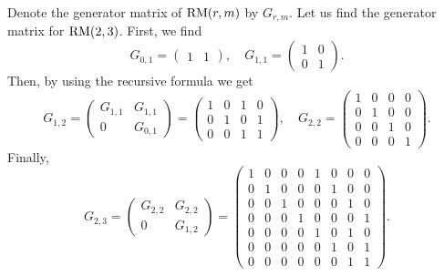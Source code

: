 \documentclass[../main.tex]{subfiles}
\begin{document}
\begin{example}
Denote the generator matrix of $\operatorname{RM}(r, m)$ by $G_{r, m}$. Let us find the generator matrix for $\operatorname{RM}(2, 3)$. First, we find
\begin{equation*}
    G_{0, 1} =
    \begin{pmatrix}
        1 & 1
    \end{pmatrix}, \quad
    G_{1, 1} =
    \begin{pmatrix}
        1 & 0 \\
        0 & 1
    \end{pmatrix}.
\end{equation*}
Then, by using the recursive formula we get
\begin{equation*}
    G_{1, 2} =
    \begin{pmatrix}
        G_{1, 1} & G_{1, 1} \\
        0 & G_{0, 1}
    \end{pmatrix} =
    \begin{pmatrix}
        1 & 0 & 1 & 0 \\
        0 & 1 & 0 & 1 \\
        0 & 0 & 1 & 1
    \end{pmatrix}, \quad
    G_{2, 2} =
    \begin{pmatrix}
        1 & 0 & 0 & 0 \\
        0 & 1 & 0 & 0 \\
        0 & 0 & 1 & 0 \\
        0 & 0 & 0 & 1
    \end{pmatrix}.
\end{equation*}
Finally,
\begin{equation*}
    G_{2, 3} =
    \begin{pmatrix}
        G_{2, 2} & G_{2, 2} \\
        0 & G_{1, 2}
    \end{pmatrix} =
    \begin{pmatrix}
        1 & 0 & 0 & 0 & 1 & 0 & 0 & 0 \\
        0 & 1 & 0 & 0 & 0 & 1 & 0 & 0 \\
        0 & 0 & 1 & 0 & 0 & 0 & 1 & 0 \\
        0 & 0 & 0 & 1 & 0 & 0 & 0 & 1 \\
        0 & 0 & 0 & 0 & 1 & 0 & 1 & 0 \\
        0 & 0 & 0 & 0 & 0 & 1 & 0 & 1 \\
        0 & 0 & 0 & 0 & 0 & 0 & 1 & 1
    \end{pmatrix}.
\end{equation*}
\end{example}
\end{document}
